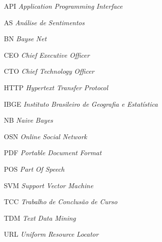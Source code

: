 \begin{siglas}
   \item[API]{\textit{Application Programming Interface}}
   \item[AS]{\textit{Análise de Sentimentos}}
   \item[BN]{\textit{Bayse Net}}
   \item[CEO]{\textit{Chief Executive Officer}}
   \item[CTO]{\textit{Chief Technology Officer}}
   \item[HTTP]{\textit{Hypertext Transfer Protocol}}
   \item[IBGE]{\textit{Instituto Brasileiro de Geografia e Estatística}}
   \item[NB]{\textit{Naive Bayes}}
   \item[OSN]{\textit{Online Social Network}}
   \item[PDF]{\textit{Portable Document Format}}
   \item[POS]{\textit{Part Of Speech}}
   \item[SVM]{\textit{Support Vector Machine}}
   \item[TCC]{\textit{Trabalho de Conclusão de Curso}}
   \item[TDM]{\textit{Text Data Mining}}
   \item[URL]{\textit{Uniform Resource Locator}}
\end{siglas}